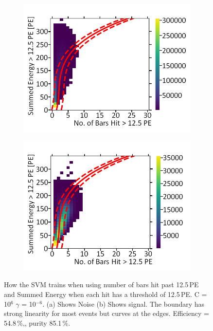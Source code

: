 \begin{figure}[!h]
\centering
\begin{subfigure}{.5\textwidth}
  \centering
  \includegraphics[width=\linewidth]{Appendix1/Figs/Bars2Sum2Noise.png}
  \captionsetup{width=.9\linewidth}
  \caption{}
  \label{subFig:Bars2Sum2N}
\end{subfigure}%
\begin{subfigure}{.5\textwidth}
  \centering
\includegraphics[width=\linewidth]{Appendix1/Figs/Bars2Sum2Signal.png}
  \captionsetup{width=.9\linewidth}
  \caption{}
  \label{subFig:Bars2Sum2S}
\end{subfigure}
\caption{How the SVM trains when using number of bars hit past 12.5\,PE and Summed Energy when each hit has a threshold of 12.5\,PE. C = 10$^6$ $\gamma$ = 10$^{-6}$. (a) Shows Noise (b) Shows signal. The boundary has strong linearity for most events but curves at the edges. Efficiency = 54.8\,\%,, purity 85.1\,\%.}
\label{fig:Bars2Sum2SN}
\end{figure}

